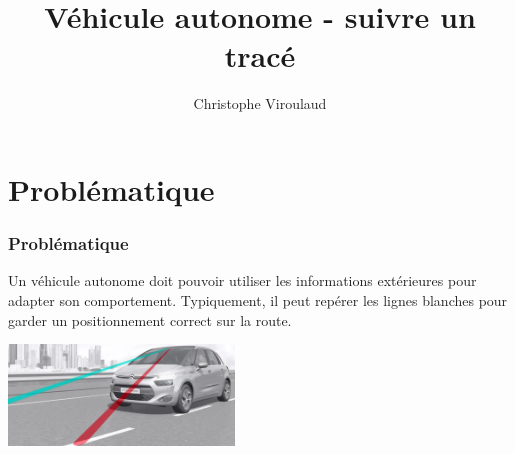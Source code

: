 \documentclass[svgnames,11pt]{beamer}
\author[]{Christophe Viroulaud}
\title{Véhicule autonome - suivre un tracé}
\date{}
\institute{Seconde - SNT}
\begin{document}
\begin{frame}
\titlepage
\end{frame}


\section{Problématique}
\begin{frame}
    \frametitle{Problématique}

    Un véhicule autonome doit pouvoir utiliser les informations extérieures pour adapter son comportement. Typiquement, il peut repérer les lignes blanches pour garder un positionnement correct sur la route.
\begin{center}
\centering
\includegraphics[width=6cm]{ressources/lignes.png}
\label{lignes}
\end{center}

\end{frame}
\end{document}
